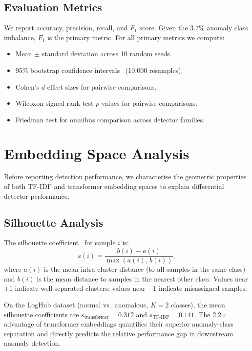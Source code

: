 \documentclass[conference]{IEEEtran}
\begin{document}
\subsection{Evaluation Metrics}

We report accuracy, precision, recall, and $F_1$ score.  Given the 3.7\%
anomaly class imbalance, $F_1$ is the primary metric.  For all primary
metrics we compute:
\begin{itemize}
    \item Mean $\pm$ standard deviation across 10 random seeds.
    \item 95\% bootstrap confidence intervals~\cite{efron1993} (10{,}000 resamples).
    \item Cohen's $d$ effect sizes for pairwise comparisons.
    \item Wilcoxon signed-rank test $p$-values for pairwise comparisons.
    \item Friedman test for omnibus comparison across detector families.
\end{itemize}

\section{Embedding Space Analysis}
\label{sec:embedding_analysis}

Before reporting detection performance, we characterise the geometric
properties of both TF-IDF and transformer embedding spaces to explain
differential detector performance.

\subsection{Silhouette Analysis}

The silhouette coefficient~\cite{rousseeuw1987} for sample $i$ is:
\begin{equation}
s(i) = \frac{b(i) - a(i)}{\max\!\left(a(i),\, b(i)\right)},
\label{eq:silhouette}
\end{equation}
where $a(i)$ is the mean intra-cluster distance (to all samples in the same
class) and $b(i)$ is the mean distance to samples in the nearest other class.
Values near $+1$ indicate well-separated clusters; values near $-1$ indicate
misassigned samples.

On the LogHub dataset (normal vs.\ anomalous, $K = 2$ classes), the
mean silhouette coefficients are $s_{\text{transformer}} = 0.312$ and
$s_{\text{TF-IDF}} = 0.141$.  The 2.2$\times$ advantage of transformer
embeddings quantifies their superior anomaly-class separation and directly
predicts the relative performance gap in downstream anomaly detection.
\end{document}
